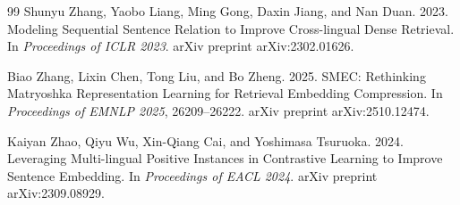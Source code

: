 \documentclass[manuscript]{acmart}
\begin{document}
\begin{thebibliography}{99}
Shunyu Zhang, Yaobo Liang, Ming Gong, Daxin Jiang, and Nan Duan. 2023.
\newblock Modeling Sequential Sentence Relation to Improve Cross-lingual Dense Retrieval.
\newblock In \emph{Proceedings of ICLR 2023}. arXiv preprint arXiv:2302.01626.

Biao Zhang, Lixin Chen, Tong Liu, and Bo Zheng. 2025.
\newblock SMEC: Rethinking Matryoshka Representation Learning for Retrieval Embedding Compression.
\newblock In \emph{Proceedings of EMNLP 2025}, 26209--26222. arXiv preprint arXiv:2510.12474.

Kaiyan Zhao, Qiyu Wu, Xin-Qiang Cai, and Yoshimasa Tsuruoka. 2024.
\newblock Leveraging Multi-lingual Positive Instances in Contrastive Learning to Improve Sentence Embedding.
\newblock In \emph{Proceedings of EACL 2024}. arXiv preprint arXiv:2309.08929.

\end{thebibliography}
\end{document}
